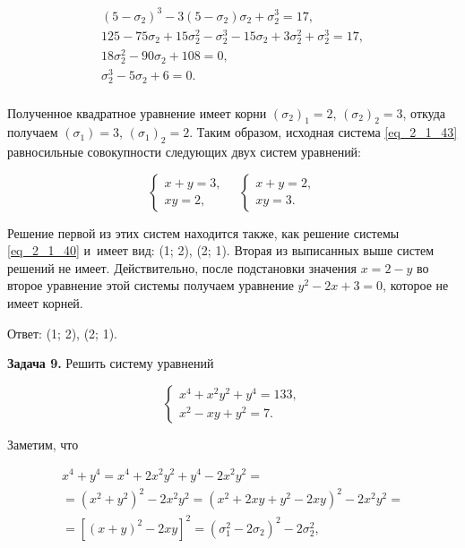 \begin{gather*}
(5 - \sigma_{2})^{3} - 3(5 - \sigma_{2})\sigma_{2} + \sigma_{2}^{3} = 17, \\
125 - 75\sigma_{2} + 15\sigma_{2}^{2} - \sigma_{2}^{3}
- 15\sigma_{2} + 3\sigma_{2}^{2} + \sigma_{2}^3 = 17, \\
18\sigma_{2}^{2} - 90\sigma_{2} +108 = 0,\\
\sigma_{2}^{3} - 5\sigma_{2} + 6 = 0. \\
\end{gather*}

Полученное квадратное уравнение имеет корни $(\sigma_{2})_{1} = 2$,
$(\sigma_{2})_{2} = 3$, откуда получаем $(\sigma_{1}) = 3$, $(\sigma_{1})_{2} = 2$.
Таким образом, исходная система \eqref{eq_2_1_43} равносильные совокупности
следующих двух систем уравнений:

\begin{equation*}
\begin{cases}
x + y = 3, \\
xy = 2,
\end{cases}
\quad
\begin{cases}
x + y = 2, \\
xy = 3.
\end{cases}
\end{equation*}

Решение первой из этих систем находится также, как решение системы \eqref{eq_2_1_40}
и~имеет вид: (1; 2), (2; 1). Вторая из выписанных выше систем решений не имеет.
Действительно, после подстановки значения $x = 2 - y$ во второе уравнение
этой системы получаем уравнение $y^{2} - 2x + 3 = 0$, которое не имеет корней.

Ответ: (1; 2), (2; 1).

\textbf{Задача 9.} Решить систему уравнений

\begin{equation}\label{eq_2_1_45}
\begin{cases}
x^{4} + x^{2}y^{2} + y^{4} = 133, \\
x^{2} - xy + y^{2} = 7.
\end{cases}
\end{equation}

Заметим, что

\begin{multline*}
x^{4} + y^{4} = 
x^{4} + 2x^{2}y^{2} + y^{4} - 2x^{2}y^{2} = \\
= (x^{2} + y^{2})^{2} - 2x^{2}y^{2} = 
(x^{2} + 2xy + y^{2} - 2xy)^{2} - 2x^{2}y^{2} = \\
= \left[
(x + y)^{2} - 2xy
\right]^{2} =
(\sigma_{1}^{2} - 2\sigma_{2})^{2} - 2\sigma_{2}^{2},
\end{multline*}

